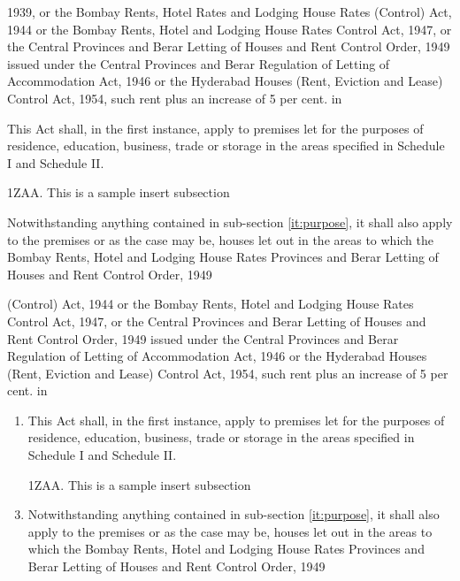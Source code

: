 \documentclass[11pt]{report}
\begin{document}
1939, or the Bombay Rents, Hotel Rates and Lodging House Rates
(Control) Act, 1944 or the Bombay Rents, Hotel and Lodging House Rates
Control Act, 1947, or the Central Provinces and Berar Letting of
Houses and Rent Control Order, 1949 issued under the Central Provinces
and Berar Regulation of Letting of Accommodation Act, 1946 or the
Hyderabad Houses (Rent, Eviction and Lease) Control Act, 1954, such
rent plus an increase of 5 per cent. in
\begin{list}{.}{%
    \settowidth{}
    \leftmargin{}
    \advance\leftmargin{}
    \advance\leftmargin{} 
    \advance\leftmargin{} 
  }
\item This Act shall, in the first instance, apply to premises let for
  the purposes of residence, education, business, trade or storage in
  the areas specified in Schedule I and Schedule II.
  \label{it:purpose}
\item[1ZAA.] This is a sample insert subsection
\item Notwithstanding anything contained in sub-section
  \ref{it:purpose}, it shall
  also apply to the premises or as the case may be, houses let out in
  the areas to which the Bombay Rents, Hotel and Lodging House Rates
  Provinces and Berar Letting of Houses and Rent Control Order, 1949
\end{list}


(Control) Act, 1944 or the Bombay Rents, Hotel and Lodging House Rates
Control Act, 1947, or the Central Provinces and Berar Letting of
Houses and Rent Control Order, 1949 issued under the Central Provinces
and Berar Regulation of Letting of Accommodation Act, 1946 or the
Hyderabad Houses (Rent, Eviction and Lease) Control Act, 1954, such
rent plus an increase of 5 per cent. in
\begin{enumerate}
\item This Act shall, in the first instance, apply to premises let for
  the purposes of residence, education, business, trade or storage in
  the areas specified in Schedule I and Schedule II.
  \label{it:purpose}
\item[1ZAA.] This is a sample insert subsection
\item Notwithstanding anything contained in sub-section
  \ref{it:purpose}, it shall
  also apply to the premises or as the case may be, houses let out in
  the areas to which the Bombay Rents, Hotel and Lodging House Rates
  Provinces and Berar Letting of Houses and Rent Control Order, 1949
\end{enumerate}
\end{document}
